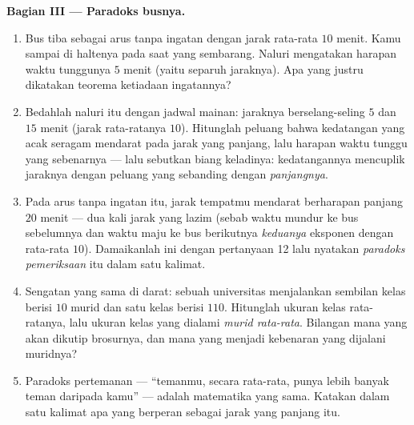\begin{problem}
\medskip
\noindent\textbf{Bagian III --- Paradoks busnya.}
\begin{enumerate}[resume]
  \item Bus tiba sebagai arus tanpa ingatan dengan jarak rata-rata $10$
        menit. Kamu sampai di haltenya pada saat yang sembarang.
        Naluri mengatakan harapan waktu tunggunya $5$ menit
        (yaitu separuh jaraknya). Apa yang justru dikatakan teorema ketiadaan ingatannya?
  \item Bedahlah naluri itu dengan jadwal mainan: jaraknya
        berselang-seling $5$ dan $15$ menit (jarak rata-ratanya $10$).
        Hitunglah peluang bahwa kedatangan yang acak seragam
        mendarat pada jarak yang panjang, lalu harapan waktu tunggu yang sebenarnya ---
        lalu sebutkan biang keladinya: kedatangannya mencuplik jaraknya dengan
        peluang yang sebanding dengan \emph{panjangnya}.
  \item Pada arus tanpa ingatan itu, jarak tempatmu mendarat berharapan
        panjang $20$ menit --- dua kali jarak yang lazim
        (sebab waktu mundur ke bus sebelumnya dan waktu maju ke bus
        berikutnya \emph{keduanya} eksponen dengan rata-rata $10$).
        Damaikanlah ini dengan pertanyaan 12 lalu nyatakan
        \emph{paradoks pemeriksaan} itu dalam satu kalimat.
  \item Sengatan yang sama di darat: sebuah universitas menjalankan sembilan kelas berisi
        $10$ murid dan satu kelas berisi $110$. Hitunglah ukuran kelas
        rata-ratanya, lalu ukuran kelas yang dialami
        \emph{murid rata-rata}. Bilangan mana yang akan dikutip brosurnya,
        dan mana yang menjadi kebenaran yang dijalani muridnya?
  \item Paradoks pertemanan --- ``temanmu, secara
        rata-rata, punya lebih banyak teman daripada kamu'' --- adalah
        matematika yang sama. Katakan dalam satu kalimat apa yang berperan sebagai
        jarak yang panjang itu.
\end{enumerate}


\end{problem}
